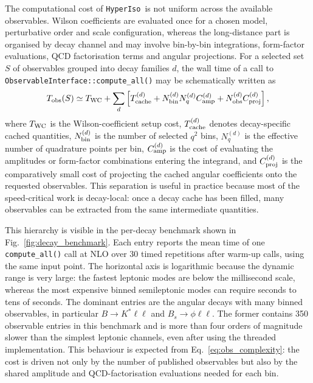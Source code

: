 \documentclass[preprint,11pt]{elsarticle}
\newcommand{\hi}{\texttt{HyperIso}}
\begin{document}
The computational cost of \hi~is not uniform across the available observables.  Wilson coefficients are evaluated once for a chosen model, perturbative order and scale configuration, whereas the long-distance part is organised by decay channel and may involve bin-by-bin integrations, form-factor evaluations, QCD factorisation terms and angular projections.  For a selected set $S$ of observables grouped into decay families $d$, the wall time of a call to \texttt{ObservableInterface::compute\_all()} may be schematically written as
\begin{equation}
    T_{\rm obs}(S)\simeq T_{\rm WC}
    +\sum_{d}\left[T_{\rm cache}^{(d)}
    +N_{\rm bin}^{(d)}N_q^{(d)}C_{\rm amp}^{(d)}
    +N_{\rm obs}^{(d)}C_{\rm proj}^{(d)}\right],
    \label{eq:obs_complexity}
\end{equation}
where $T_{\rm WC}$ is the Wilson-coefficient setup cost, $T_{\rm cache}^{(d)}$ denotes decay-specific cached quantities, $N_{\rm bin}^{(d)}$ is the number of selected $q^2$ bins, $N_q^{(d)}$ is the effective number of quadrature points per bin, $C_{\rm amp}^{(d)}$ is the cost of evaluating the amplitudes or form-factor combinations entering the integrand, and $C_{\rm proj}^{(d)}$ is the comparatively small cost of projecting the cached angular coefficients onto the requested observables.  This separation is useful in practice because most of the speed-critical work is decay-local: once a decay cache has been filled, many observables can be extracted from the same intermediate quantities.

This hierarchy is visible in the per-decay benchmark shown in Fig.~\ref{fig:decay_benchmark}.  Each entry reports the mean time of one \texttt{compute\_all()} call at NLO over 30 timed repetitions after warm-up calls, using the same input point. The horizontal axis is logarithmic because the dynamic range is very large: the fastest leptonic modes are below the millisecond scale, whereas the most expensive binned semileptonic modes can require seconds to tens of seconds.  The dominant entries are the angular decays with many binned observables, in particular $B\to K^*\ell\ell$ and $B_s\to\phi\ell\ell$.  The former contains 350 observable entries in this benchmark and is more than four orders of magnitude slower than the simplest leptonic channels, even after using the threaded implementation.  This behaviour is expected from Eq.~\eqref{eq:obs_complexity}: the cost is driven not only by the number of published observables but also by the shared amplitude and QCD-factorisation evaluations needed for each bin.
\end{document}
